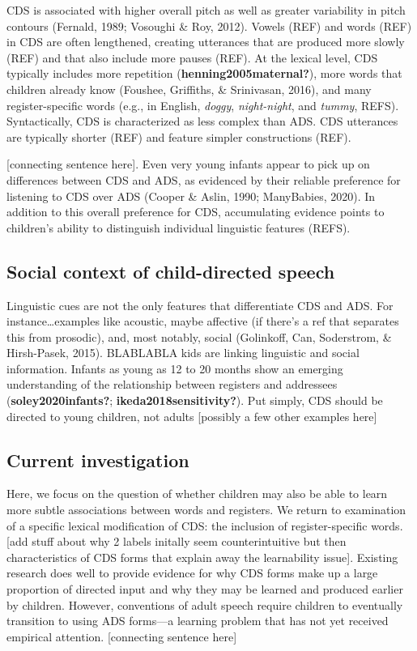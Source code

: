 \documentclass[10pt, letterpaper]{article}
\begin{document}
CDS is associated with higher overall pitch as well as greater
variability in pitch contours (Fernald, 1989; Vosoughi \& Roy, 2012).
Vowels (REF) and words (REF) in CDS are often lengthened, creating
utterances that are produced more slowly (REF) and that also include
more pauses (REF). At the lexical level, CDS typically includes more
repetition (\textbf{henning2005maternal?}), more words that children
already know (Foushee, Griffiths, \& Srinivasan, 2016), and many
register-specific words (e.g., in English, \emph{doggy},
\emph{night-night}, and \emph{tummy}, REFS). Syntactically, CDS is
characterized as less complex than ADS. CDS utterances are typically
shorter (REF) and feature simpler constructions (REF).

{[}connecting sentence here{]}. Even very young infants appear to pick
up on differences between CDS and ADS, as evidenced by their reliable
preference for listening to CDS over ADS (Cooper \& Aslin, 1990;
ManyBabies, 2020). In addition to this overall preference for CDS,
accumulating evidence points to children's ability to distinguish
individual linguistic features (REFS).

\hypertarget{social-context-of-child-directed-speech}{%
\subsection{Social context of child-directed
speech}\label{social-context-of-child-directed-speech}}

Linguistic cues are not the only features that differentiate CDS and
ADS. For instance\ldots examples like acoustic, maybe affective (if
there's a ref that separates this from prosodic), and, most notably,
social (Golinkoff, Can, Soderstrom, \& Hirsh-Pasek, 2015). BLABLABLA
kids are linking linguistic and social information. Infants as young as
12 to 20 months show an emerging understanding of the relationship
between registers and addressees (\textbf{soley2020infants?};
\textbf{ikeda2018sensitivity?}). Put simply, CDS should be directed to
young children, not adults {[}possibly a few other examples here{]}

\hypertarget{current-investigation}{%
\subsection{Current investigation}\label{current-investigation}}

Here, we focus on the question of whether children may also be able to
learn more subtle associations between words and registers. We return to
examination of a specific lexical modification of CDS: the inclusion of
register-specific words. {[}add stuff about why 2 labels initally seem
counterintuitive but then characteristics of CDS forms that explain away
the learnability issue{]}. Existing research does well to provide
evidence for why CDS forms make up a large proportion of directed input
and why they may be learned and produced earlier by children. However,
conventions of adult speech require children to eventually transition to
using ADS forms---a learning problem that has not yet received empirical
attention. {[}connecting sentence here{]}
\end{document}
